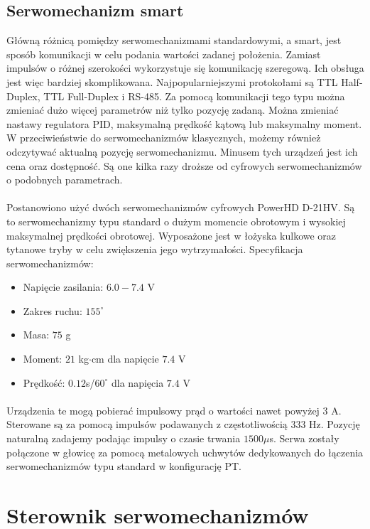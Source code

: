 \subsection{Serwomechanizm smart}
Główną różnicą pomiędzy serwomechanizmami standardowymi, a smart, jest sposób komunikacji w celu podania wartości zadanej położenia. Zamiast impulsów o różnej szerokości wykorzystuje się komunikację szeregową. Ich obsługa jest więc bardziej skomplikowana. Najpopularniejszymi protokołami są TTL Half-Duplex, TTL Full-Duplex i RS-485. Za pomocą komunikacji tego typu można zmieniać dużo więcej parametrów niż tylko pozycję zadaną. Można zmieniać nastawy regulatora PID, maksymalną prędkość kątową lub maksymalny moment. W przeciwieństwie do serwomechanizmów klasycznych, możemy również odczytywać aktualną pozycję serwomechanizmu. Minusem tych urządzeń jest ich cena oraz dostępność. Są one kilka razy droższe od cyfrowych serwomechanizmów o podobnych parametrach.

\paragraph*{}
Postanowiono użyć dwóch serwomechanizmów cyfrowych PowerHD D-21HV. Są to serwomechanizmy typu standard o dużym momencie obrotowym i wysokiej maksymalnej prędkości obrotowej. Wyposażone jest w łożyska kulkowe oraz tytanowe tryby w celu zwiększenia jego wytrzymałości. Specyfikacja serwomechanizmów:
\begin{itemize}
\item Napięcie zasilania: \(6.0-7.4\) V
\item Zakres ruchu: \(155^\circ\)
\item Masa: \(75\) g
\item Moment: \(21\) kg\(\cdot\)cm dla napięcie \(7.4\) V
\item Prędkość: \(0.12\)s/\(60^\circ\) dla napięcia \(7.4\) V
\end{itemize}
\paragraph*{}
Urządzenia te mogą pobierać impulsowy prąd o wartości nawet powyżej 3 A. Sterowane są za pomocą impulsów podawanych z częstotliwością 333 Hz. Pozycję naturalną zadajemy podając impulsy o czasie trwania \(1500 \mu\)s. Serwa zostały połączone w głowicę za pomocą metalowych uchwytów dedykowanych do łączenia serwomechanizmów typu standard w konfigurację PT.

\section{Sterownik serwomechanizmów}
\label{sec:sterownik}

